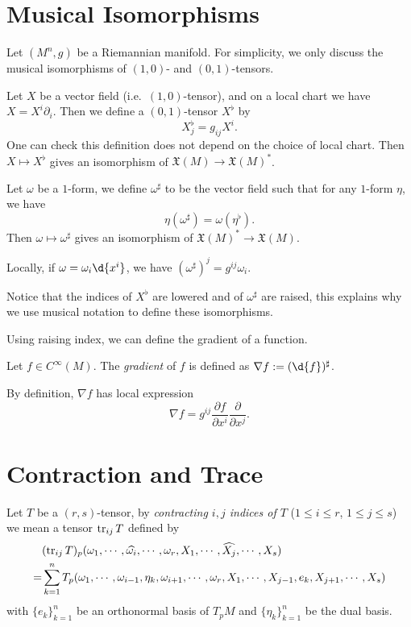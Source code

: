 \section{Musical Isomorphisms}
Let $(M^n,g)$ be a Riemannian manifold.
For simplicity, we only discuss the musical isomorphisms of $(1,0)$- and $(0,1)$-tensors.

\begin{defn}
    Let $X$ be a vector field (i.e.\ $(1,0)$-tensor), and on a local chart we have $X=X^i\partial_i$.
    Then we define a $(0,1)$-tensor $X^\flat$ by
    \[X^\flat_j=g_{ij}X^i.\]
    One can check this definition does not depend on the choice of local chart.
    Then $X\mapsto X^\flat$ gives an isomorphism of $\mathfrak{X}(M)\to\mathfrak{X}(M)^*$.
\end{defn}

\begin{defn}
    Let $\omega$ be a $1$-form, we define $\omega^\sharp$ to be the vector field such that for any $1$-form $\eta$, we have
    \[\eta(\omega^\sharp)=\omega(\eta^\flat).\]
    Then $\omega\mapsto\omega^\sharp$ gives an isomorphism of $\mathfrak{X}(M)^*\to\mathfrak{X}(M)$.
\end{defn}

Locally, if $\omega=\omega_i\d{x^i}$, we have $(\omega^\sharp)^j=g^{ij}\omega_i$.

Notice that the indices of $X^\flat$ are lowered and of $\omega^\sharp$ are raised, this explains why we use musical notation to define these isomorphisms.

Using raising index, we can define the gradient of a function.
\begin{defn}
    Let $f\in C^\infty(M)$.
    The \emph{gradient} of $f$ is defined as $\nabla f:=(\d{f})^\sharp$.
\end{defn}

By definition, $\nabla f$ has local expression
\[\nabla f=g^{ij}\frac{\partial f}{\partial{x^i}}\frac{\partial{}}{\partial{x^j}}.\]

\section{Contraction and Trace}

\begin{defn}
    Let $T$ be a $(r,s)$-tensor, by \emph{contracting $i,j$ indices of $T$} ($1\leq i\leq r$, $1\leq j\leq s$) we mean a tensor $\operatorname{tr}_{ij}T$ defined by
    \begin{align*}
        &(\operatorname{tr}_{ij}T)_p(\omega_1,\cdots,\widehat{\omega_i},\cdots,\omega_r,X_1,\cdots,\widehat{X_j},\cdots,X_s)\\
        =&\sum_{k=1}^nT_p(\omega_1,\cdots,\omega_{i-1},\eta_k,\omega_{i+1},\cdots,\omega_r,X_1,\cdots,X_{j-1},e_k,X_{j+1},\cdots,X_s)
    \end{align*}
    with $\{e_k\}_{k=1}^n$ be an orthonormal basis of $T_pM$ and $\{\eta_k\}_{k=1}^n$ be the dual basis.
\end{defn}

